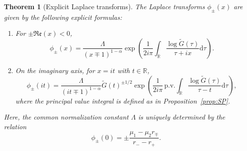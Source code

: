 \documentclass{article}
\theoremstyle{plain}
\newtheorem{theorem}{Theorem}[section]
\theoremstyle{definition}
\theoremstyle{remark}
\begin{document}
\begin{theorem}[Explicit Laplace transforms]\label{thm:laplace} 
The Laplace transforms $\phi_\pm(x)$ are given by the following explicit formulas:
\begin{enumerate}
    \item[(a)] For $\pm \mathfrak{Re}(x) < 0$,
    \begin{equation*}
        \phi_\pm(x) = \frac{\Lambda}{(x \mp 1)^{1-\alpha}} \exp\left(\frac{1}{2i\pi} \int_{\mathbb{R}} \frac{\log\widetilde{G}(\tau)}{\tau+ix} \mathrm{d}\tau \right).
    \end{equation*}
    \item[(b)] On the imaginary axis, for $x=it$ with $t \in \mathbb{R}$,
    \begin{equation*}
        \phi_\pm(it) = \frac{\Lambda}{(it \mp 1)^{1-\alpha}} \widetilde{G}(t)^{\pm 1/2} \exp\left(\frac{1}{2i\pi} \,\mathrm{p.v.} \int_{\mathbb{R}} \frac{\log\widetilde{G}(\tau)}{\tau-t} \mathrm{d}\tau \right),
    \end{equation*}
    where the principal value integral is defined as in Proposition~\ref{prop:SP}.
\end{enumerate}
Here, the common normalization constant $\Lambda$ is uniquely determined by the relation
\begin{equation}\label{eq:normalization}
    \phi_\pm(0) = \pm \frac{\mu_1 - \mu_2 r_\mp}{r_- - r_+}.
\end{equation}
\end{theorem}
\end{document}
